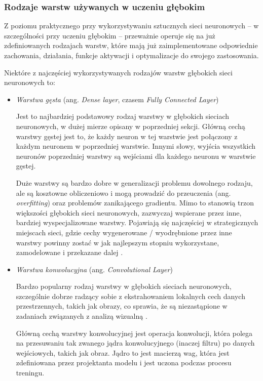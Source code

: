 \subsubsection{Rodzaje warstw używanych w uczeniu głębokim}
\label{sec:deep-learning-layers}

Z poziomu praktycznego przy wykorzystywaniu sztucznych sieci neuronowych -- w szczególności przy uczeniu głębokim -- przeważnie operuje się na już zdefiniowanych rodzajach warstw, które mają już zaimplementowane odpowiednie zachowania, działania, funkcje aktywacji i optymalizacje do swojego zastosowania.

Niektóre z najczęściej wykorzystywanych rodzajów warstw głębokich sieci neuronowych to:

\begin{itemize}

  \item \emph{Warstwa gęsta} (ang. \emph{Dense layer}, czasem \emph{Fully Connected Layer})

        Jest to najbardziej podstawowy rodzaj warstwy w głębokich sieciach neuronowych, w dużej mierze opisany w poprzedniej sekcji.
        Główną cechą warstwy gęstej jest to, że każdy neuron w tej warstwie jest połączony z każdym neuronem w poprzedniej warstwie.
        Innymi słowy, wyjścia wszystkich neuronów poprzedniej warstwy są wejściami dla każdego neuronu w warstwie gęstej.

        Duże warstwy są bardzo dobre w generalizacji problemu dowolnego rodzaju, ale są kosztowne obliczeniowo i mogą prowadzić do przeuczenia (ang. \emph{overfitting}) oraz problemów
        zanikającego gradientu.
        Mimo to stanowią trzon większości głębokich sieci neuronowych, zazwyczaj wspierane przez inne, bardziej wyspecjalizowane warstwy.
        Pojawiają się najczęściej w strategicznych miejscach sieci, gdzie cechy wygenerowane / wyodrębnione przez inne warstwy powinny zostać w jak najlepszym stopniu wykorzystane, zamodelowane i przekazane dalej \cite{josephine2021impact}.

  \item \emph{Warstwa konwolucyjna} (ang. \emph{Convolutional Layer})

        Bardzo popularny rodzaj warstwy w głębokich sieciach neuronowych, szczególnie dobrze radzący sobie z ekstrahowaniem lokalnych cech danych przestrzennych, takich jak obrazy, co sprawia, że są niezastąpione w zadaniach związanych z analizą wizualną \cite{albawi2017understanding}.

        Główną cechą warstwy konwolucyjnej jest operacja konwolucji, która polega na przesuwaniu tak zwanego jądra konwolucyjnego (inaczej filtru) po danych wejściowych, takich jak obraz.
        Jądro to jest macierzą wag, która jest zdefiniowana przez projektanta modelu i jest uczona podczas procesu treningu.


\end{itemize}
